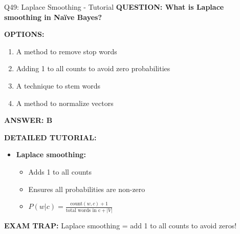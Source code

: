 \documentclass[8pt]{beamer}
\begin{document}
	\begin{frame}{Q49: Laplace Smoothing - Tutorial}
		\fontsize{6.5}{7.5}\selectfont
		\textbf{QUESTION: What is Laplace smoothing in Naïve Bayes?}
		
		\vspace{0.1cm}
		\textbf{OPTIONS:}
		\begin{enumerate}
			\item A method to remove stop words
			\item Adding 1 to all counts to avoid zero probabilities
			\item A technique to stem words
			\item A method to normalize vectors
		\end{enumerate}
		
		\vspace{0.1cm}
		\textcolor{myblue}{\textbf{ANSWER: B}}
		
		\vspace{0.1cm}
		\textbf{DETAILED TUTORIAL:}
		\begin{itemize}
			\item \textbf{Laplace smoothing:}
			\begin{itemize}
				\item Adds 1 to all counts
				\item Ensures all probabilities are non-zero
				\item $P(w|c) = \frac{\text{count}(w,c) + 1}{\text{total words in c} + |V|}$
			\end{itemize}
		\end{itemize}
		
		\textcolor{myred}{\textbf{EXAM TRAP:}} Laplace smoothing = \textcolor{myblue}{add 1 to all counts to avoid zeros}!
	\end{frame}
	
\end{document}
